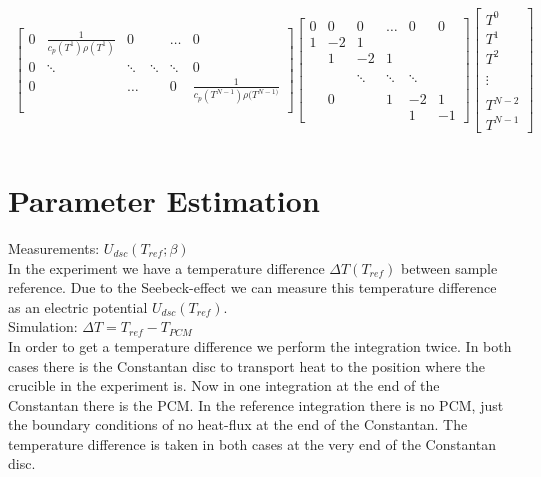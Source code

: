 \documentclass{scrartcl}[12pt, halfparskip]
\begin{document}
\begin{align*}
\begin{bmatrix}
		0 & \frac{1}{c_p(T^1) \rho(T^1)} & 0 & & \dots & 0 \\
		0 & \ddots & \ddots & \ddots & \ddots & 0 \\
		0 & & \dots & & 0 & \frac{1}{c_p(T^{N-1}) \rho(T^{N-1)}} \\
	\end{bmatrix}
	\begin{bmatrix}
		0 & 0 & 0 & \dots & 0 & 0 \\
		1 & -2 & 1 & & &  \\
		& 1 & -2 & 1 & \\
		\\
		& & \ddots & \ddots & \ddots \\
		\\
		& 0 & &  1 & -2 & 1 \\
		& & & & 1 & -1
	\end{bmatrix}
	\begin{bmatrix*}
		T^0 \\
		T^1 \\
		T^2 \\
		\\
		\vdots \\
		\\
		T^{N-2} \\
		T^{N-1}
	\end{bmatrix*} \\
\end{align*}


\section{Parameter Estimation}

Measurements: $U_{dsc}(T_{ref};\beta)$ \\
In the experiment we have a temperature difference $\Delta T(T_{ref})$ between sample reference. 
Due to the Seebeck-effect we can measure this temperature difference as an electric potential $U_{dsc}(T_{ref})$. \\


Simulation: $\Delta T = T_{ref} - T_{PCM}$ \\
In order to get a temperature difference we perform the integration twice. 
In both cases there is the Constantan disc to transport heat to the position where the crucible in the experiment is. 
Now in one integration at the end of the Constantan there is the PCM. 
In the reference integration there is no PCM, just the boundary conditions of no heat-flux at the end of the Constantan.
The temperature difference is taken in both cases at the very end of the Constantan disc. \\
\end{document}
